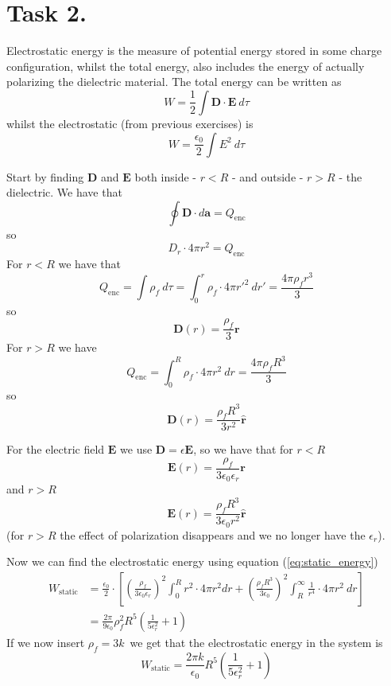 \documentclass[a4paper,11pt]{article}
\begin{document}
\section*{Task 2.}
\begin{alphalist}
    \item Electrostatic energy is the measure of potential energy stored in some charge configuration, whilst the total energy, 
        also includes the energy of actually polarizing the dielectric material. The total energy can be written as
        \begin{equation}
            W = \frac{1}{2} \int \mathbf{D} \cdot \mathbf{E} \:d\tau
            \label{eq:total_energy}
        \end{equation}
        whilst the electrostatic (from previous exercises) is
        \begin{equation}
            W = \frac{\epsilon_0}{2}\int E^2 \:d\tau
            \label{eq:static_energy}
        \end{equation}
    \item Start by finding $\mathbf{D}$ and $\mathbf{E}$ both inside - $r < R$ - and outside - $r > R$ - the dielectric.
        We have that 
        \[
            \oint \mathbf{D} \cdot d\mathbf{a} = Q_{\text{enc}}
        \]
        so
        \[
            D_r \cdot 4\pi r^2 = Q_{\text{enc}}
        \]
        For $r < R$ we have that
        \[
            Q_{\text{enc}} = \int \rho_f \:d\tau = \int_{0}^{r} \rho_f \cdot 4\pi r'^2 \:dr' = \frac{4\pi \rho_f r^3}{3}
        \]
        so
        \[
            \boxed{\mathbf{D}(r) = \frac{\rho_f}{3}\mathbf{r}}
        \]
        For $r > R$ we have 
        \[
            Q_{\text{enc}} = \int_{0}^{R} \rho_f \cdot 4\pi r^2 \:dr = \frac{4\pi \rho_f R^3}{3}
        \]
        so
        \[
            \boxed{\mathbf{D}(r) = \frac{\rho_f R^3}{3r^2}\mathbf{\hat{r}}}
        \]

        For the electric field $\mathbf{E}$ we use $\mathbf{D} = \epsilon \mathbf{E}$, so
        we have that for $r < R$
        \[
            \boxed{\mathbf{E}(r) = \frac{\rho_f}{3\epsilon_0\epsilon_r}\mathbf{r}}
        \]
        and $r > R$
        \[
            \boxed{\mathbf{E}(r) = \frac{\rho_f R^3}{3\epsilon_0 r^2}\mathbf{\hat{r}}}
        \]
        (for $r > R$ the effect of polarization disappears and we no longer have the $\epsilon_r$).

        Now we can find the electrostatic energy using equation (\ref{eq:static_energy})
        \begin{align*}
            W_{\text{static}} &= \frac{\epsilon_0}{2} \cdot \left[\left(\frac{\rho_f}{3\epsilon_0\epsilon_r}\right)^2 \int_0^R r^2 \cdot 4\pi r^2 dr
            + \left(\frac{\rho_f R^3}{3\epsilon_0}\right)^2 \int_R^{\infty} \frac{1}{r^4} \cdot 4\pi r^2 \:dr \right] \\
                              &= \frac{2\pi}{9\epsilon_0}\rho_f^2 R^5 \left(\frac{1}{5\epsilon_r^2} + 1\right)
        \end{align*}
        If we now insert $\rho_f = 3k$ we get that the electrostatic energy in the system is
        \[
            W_{\text{static}} = \frac{2\pi k}{\epsilon_0} R^{5}\left(\frac{1}{5\epsilon_r^2} + 1\right)
        \]


\end{alphalist}
\end{document}
